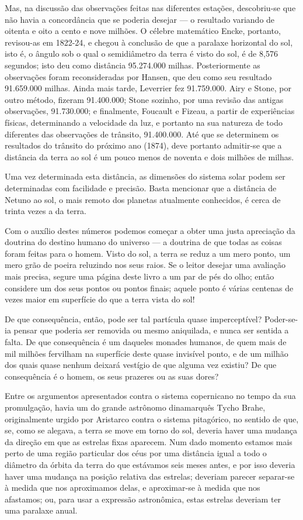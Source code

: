 \documentclass[11pt,a5paper,twoside,openany]{book}
\begin{document}
Mas, na discussão das observações feitas nas diferentes estações, descobriu-se que não havia a concordância que se poderia desejar — o resultado variando de oitenta e oito a cento e nove milhões. O célebre matemático Encke, portanto, revisou-as em 1822-24, e chegou à conclusão de que a paralaxe horizontal do sol, isto é, o ângulo sob o qual o semidiâmetro da terra é visto do sol, é de 8,576 segundos; isto deu como distância 95.274.000 milhas. Posteriormente as observações foram reconsideradas por Hansen, que deu como seu resultado 91.659.000 milhas. Ainda mais tarde, Leverrier fez 91.759.000. Airy e Stone, por outro método, fizeram 91.400.000; Stone sozinho, por uma revisão das antigas observações, 91.730.000; e finalmente, Foucault e Fizeau, a partir de experiências físicas, determinando a velocidade da luz, e portanto na sua natureza de todo diferentes das observações de trânsito, 91.400.000. Até que se determinem os resultados do trânsito do próximo ano (1874), deve portanto admitir-se que a distância da terra ao sol é um pouco menos de noventa e dois milhões de milhas.

Uma vez determinada esta distância, as dimensões do sistema solar podem ser determinadas com facilidade e precisão. Basta mencionar que a distância de Netuno ao sol, o mais remoto dos planetas atualmente conhecidos, é cerca de trinta vezes a da terra.

Com o auxílio destes números podemos começar a obter uma justa apreciação da doutrina do destino humano do universo — a doutrina de que todas as coisas foram feitas para o homem. Visto do sol, a terra se reduz a um mero ponto, um mero grão de poeira reluzindo nos seus raios. Se o leitor desejar uma avaliação mais precisa, segure uma página deste livro a um par de pés do olho; então considere um dos seus pontos ou pontos finais; aquele ponto é várias centenas de vezes maior em superfície do que a terra vista do sol!

De que consequência, então, pode ser tal partícula quase imperceptível? Poder-se-ia pensar que poderia ser removida ou mesmo aniquilada, e nunca ser sentida a falta. De que consequência é um daqueles monades humanos, de quem mais de mil milhões fervilham na superfície deste quase invisível ponto, e de um milhão dos quais quase nenhum deixará vestígio de que alguma vez existiu? De que consequência é o homem, os seus prazeres ou as suas dores?

Entre os argumentos apresentados contra o sistema copernicano no tempo da sua promulgação, havia um do grande astrônomo dinamarquês Tycho Brahe, originalmente urgido por Aristarco contra o sistema pitagórico, no sentido de que, se, como se alegava, a terra se move em torno do sol, deveria haver uma mudança da direção em que as estrelas fixas aparecem. Num dado momento estamos mais perto de uma região particular dos céus por uma distância igual a todo o diâmetro da órbita da terra do que estávamos seis meses antes, e por isso deveria haver uma mudança na posição relativa das estrelas; deveriam parecer separar-se à medida que nos aproximamos delas, e aproximar-se à medida que nos afastamos; ou, para usar a expressão astronômica, estas estrelas deveriam ter uma paralaxe anual.
\end{document}

